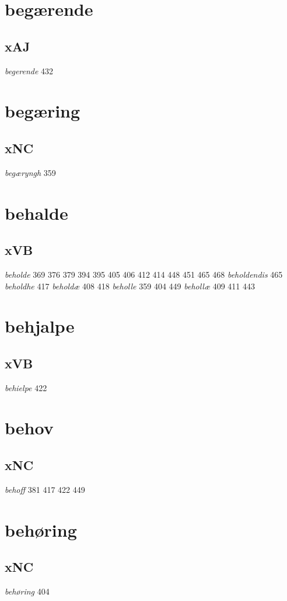\documentclass[a4paper,twocolumn]{article}
\begin{document}
\section{begærende}
\label{sec:orga2e2837}
\subsection{xAJ}
\label{sec:org286f3b1}
\emph{begerende} 432 
\section{begæring}
\label{sec:orgad9e515}
\subsection{xNC}
\label{sec:org7925447}
\emph{begæryngh} 359 
\section{behalde}
\label{sec:org1e9ee80}
\subsection{xVB}
\label{sec:orgd6ecc41}
\emph{beholde} 369 376 379 394 395 405 406 412 414 448 451 465 468 \emph{beholdendis} 465 \emph{beholdhe} 417 \emph{beholdæ} 408 418 \emph{beholle} 359 404 449 \emph{behollæ} 409 411 443 
\section{behjalpe}
\label{sec:org87d2f9c}
\subsection{xVB}
\label{sec:orgb050ec1}
\emph{behielpe} 422 
\section{behov}
\label{sec:org2ebb3b8}
\subsection{xNC}
\label{sec:org4b02fd2}
\emph{behoff} 381 417 422 449 
\section{behøring}
\label{sec:orgc162880}
\subsection{xNC}
\label{sec:org1f1378f}
\emph{behøring} 404 
\end{document}
